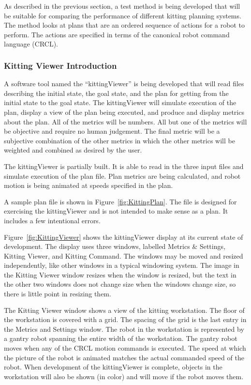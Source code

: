 \renewcommand{\topfraction}{1.0}
\setcounter{topnumber}{100}

As described in the previous section, a test method is being developed that
will be suitable for comparing the performance of different kitting
planning systems. The method looks at plans that are an ordered sequence
of actions for a robot to perform. The actions are specified in terms of
the canonical robot command language (CRCL).

\subsubsection{Kitting Viewer Introduction}
A software tool named the ``kittingViewer'' is being developed that will
read files describing the initial state, the goal state, and the plan for
getting from the initial state to the goal state. The kittingViewer will
simulate execution of the plan, display a view of the plan being executed,
and produce and display metrics about the plan.  All of the metrics will be
numbers. All but one of the metrics will be objective and require no human
judgement. The final metric will be a subjective combination of the other
metrics in which the other metrics will be weighted and combined as desired
by the user.

The kittingViewer is partially built. It is able to read in the three
input files and simulate execution of the plan file. Plan metrics are
being calculated, and robot motion is being animated at speeds specified
in the plan.

A sample plan file is shown in Figure~\ref{fig:KittingPlan}. The file is
designed for exercising the kittingViewer and is not intended to make sense
as a plan. It includes a few intentional errors.

Figure~\ref{fig:KittingViewer} shows the kittingViewer display at its
current state of development. The display uses three windows, labelled
Metrics \& Settings, Kitting Viewer, and Kitting Command. The windows may
be moved and resized independently, like other windows in a typical
windowing system. The image in the Kitting Viewer window resizes when the
window is resized, but the text in the other two windows does not
change size when the windows change size, so there is little point in
resizing them.

The Kitting Viewer window shows a view of the kitting workstation. The
floor of the workstation is covered with a grid. The spacing of the grid is
the last entry in the Metrics and Settings window. The robot in the
workstation is represented by a gantry robot spanning the entire width of
the workstation.  The gantry robot moves when any of the CRCL motion
commands is executed.  The speed at which the picture of the robot is
animated matches the actual commanded speed of the robot.  When development
of the kittingViewer is complete, objects in the workstation will also be
shown (in color) and will move if the robot moves them.

